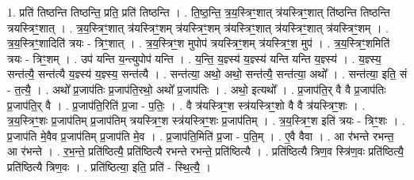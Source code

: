 \documentclass[17pt]{extarticle}
\begin{document}
1. प्रति॑ तिष्ठन्ति तिष्ठन्ति॒ प्रति॒ प्रति॑ तिष्ठन्ति । . ति॒ष्ठ॒न्ति॒ त्र॒य॒स्त्रिꣳ॒॒शात् त्र॑यस्त्रिꣳ॒॒शात् ति॑ष्ठन्ति तिष्ठन्ति त्रयस्त्रिꣳ॒॒शात् । . त्र॒य॒स्त्रिꣳ॒॒शात् त्र॑यस्त्रिꣳ॒॒शम् त्र॑यस्त्रिꣳ॒॒शम् त्र॑यस्त्रिꣳ॒॒शात् त्र॑यस्त्रिꣳ॒॒शात् त्र॑यस्त्रिꣳ॒॒शम् । . त्र॒य॒स्त्रिꣳ॒॒शादिति॑ त्रयः - त्रिꣳ॒॒शात् । . त्र॒य॒स्त्रिꣳ॒॒श मुपोप॑ त्रयस्त्रिꣳ॒॒शम् त्र॑यस्त्रिꣳ॒॒श मुप॑ । . त्र॒य॒स्त्रिꣳ॒॒शमिति॑ त्रयः - त्रिꣳ॒॒शम् । . उप॑ यन्ति य॒न्त्युपोप॑ यन्ति । . य॒न्ति॒ य॒ज्ञ्स्य॑ य॒ज्ञ्स्य॑ यन्ति यन्ति य॒ज्ञ्स्य॑ । . य॒ज्ञ्स्य॒ सन्त॑त्यै॒ सन्त॑त्यै य॒ज्ञ्स्य॑ य॒ज्ञ्स्य॒ सन्त॑त्यै । . सन्त॑त्या॒ अथो॒ अथो॒ सन्त॑त्यै॒ सन्त॑त्या॒ अथो᳚ । . सन्त॑त्या॒ इति॒ सं - त॒त्यै॒ । . अथो᳚ प्र॒जाप॑तिः प्र॒जाप॑ति॒रथो॒ अथो᳚ प्र॒जाप॑तिः । . अथो॒ इत्यथो᳚ । . प्र॒जाप॑ति॒र् वै वै प्र॒जाप॑तिः प्र॒जाप॑ति॒र् वै । . प्र॒जाप॑ति॒रिति॑ प्र॒जा - प॒तिः॒ । . वै त्र॑यस्त्रिꣳ॒॒श स्त्र॑यस्त्रिꣳ॒॒शो वै वै त्र॑यस्त्रिꣳ॒॒शः । . त्र॒य॒स्त्रिꣳ॒॒शः प्र॒जाप॑तिम् प्र॒जाप॑तिम् त्रयस्त्रिꣳ॒॒श स्त्र॑यस्त्रिꣳ॒॒शः प्र॒जाप॑तिम् । . त्र॒य॒स्त्रिꣳ॒॒श इति॑ त्रयः - त्रिꣳ॒॒शः । . प्र॒जाप॑ति मे॒वैव प्र॒जाप॑तिम् प्र॒जाप॑ति मे॒व । . प्र॒जाप॑ति॒मिति॑ प्र॒जा - प॒ति॒म् । . ए॒वै वैवा । . आ र॑भन्ते रभन्त॒ आ र॑भन्ते । . र॒भ॒न्ते॒ प्रति॑ष्ठित्यै॒ प्रति॑ष्ठित्यै रभन्ते रभन्ते॒ प्रति॑ष्ठित्यै । . प्रति॑ष्ठित्यै त्रिण॒व स्त्रि॑ण॒वः प्रति॑ष्ठित्यै॒ प्रति॑ष्ठित्यै त्रिण॒वः । . प्रति॑ष्ठित्या॒ इति॒ प्रति॑ - स्थि॒त्यै॒ । \newline
\end{document}
